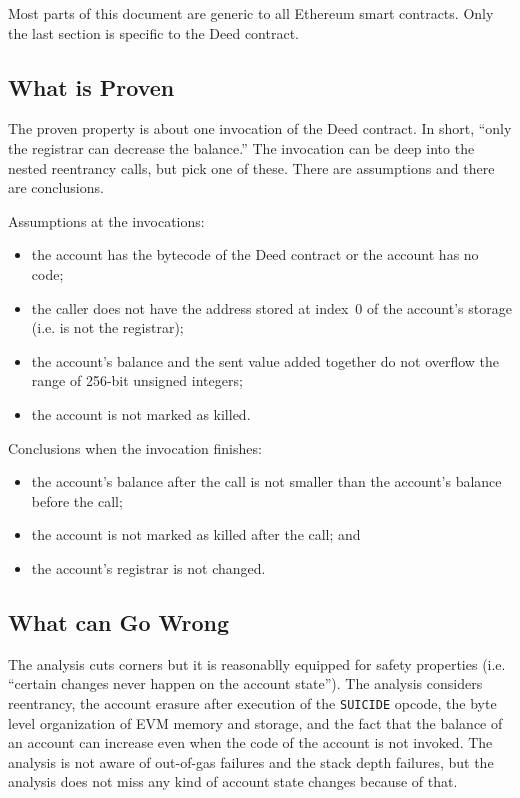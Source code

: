 \documentclass[11pt,a4paper]{article}
\begin{document}
Most parts of this document are generic to all Ethereum smart
contracts.  Only the last section is specific to the Deed contract.

\subsection{What is Proven}

The proven property is about one invocation of the Deed contract.
In short, ``only the registrar can decrease the balance.''
The invocation can be deep into the nested reentrancy calls, but pick
one of these.
There are assumptions and there are conclusions.

Assumptions at the invocations:
\begin{itemize}
  \item the account has the bytecode of the Deed contract or the
    account has no code;
  \item the caller does not have the address stored at index~0 of the
    account's storage (i.e. is not the registrar);
  \item the account's balance and the sent value added together do not
    overflow the range of 256-bit unsigned integers;
  \item the account is not marked as killed.
\end{itemize}

Conclusions when the invocation finishes:
\begin{itemize}
  \item the account's balance after the call is not smaller than the
    account's balance before the call;
  \item the account is not marked as killed after the call; and
  \item the account's registrar is not changed.
\end{itemize}


\subsection{What can Go Wrong}

The analysis cuts corners but it is reasonablly equipped for safety
properties (i.e. ``certain changes never happen on the account
state'').  The analysis considers reentrancy, the account erasure after execution
of the \texttt{SUICIDE} opcode, the byte level organization of EVM
memory and storage, and the fact that the balance of an account can
increase even when the code of the account is not invoked.
The analysis is not aware of out-of-gas failures and the stack depth
failures, but the analysis does not miss any kind of account state
changes because of that.
\end{document}
